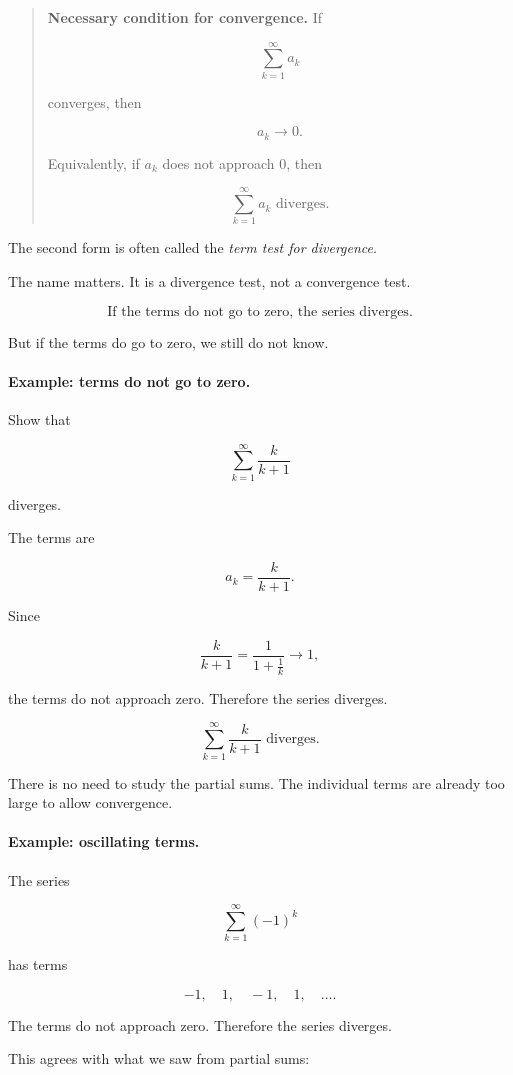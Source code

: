 \begin{quote}
\textbf{Necessary condition for convergence.}
If

\[
\sum_{k=1}^{\infty}a_k
\]

converges, then

\[
\boxed{a_k\to0.}
\]

Equivalently, if \(a_k\) does not approach \(0\), then

\[
\boxed{\sum_{k=1}^{\infty}a_k \text{ diverges.}}
\]
\end{quote}

The second form is often called the \emph{term test for divergence}.

The name matters.  It is a divergence test, not a convergence test.

\[
\boxed{
\text{If the terms do not go to zero, the series diverges.}
}
\]

But if the terms do go to zero, we still do not know.

\paragraph{Example: terms do not go to zero.}
Show that

\[
\sum_{k=1}^{\infty}\frac{k}{k+1}
\]

diverges.

The terms are

\[
a_k=\frac{k}{k+1}.
\]

Since

\[
\frac{k}{k+1}=\frac{1}{1+\frac1k}\to1,
\]

the terms do not approach zero.  Therefore the series diverges.

\[
\boxed{
\sum_{k=1}^{\infty}\frac{k}{k+1} \text{ diverges.}
}
\]

There is no need to study the partial sums.  The individual terms are already too large
to allow convergence.

\paragraph{Example: oscillating terms.}
The series

\[
\sum_{k=1}^{\infty}(-1)^k
\]

has terms

\[
-1,
\quad 1,
\quad -1,
\quad 1,
\quad\ldots.
\]

The terms do not approach zero.  Therefore the series diverges.

This agrees with what we saw from partial sums:

